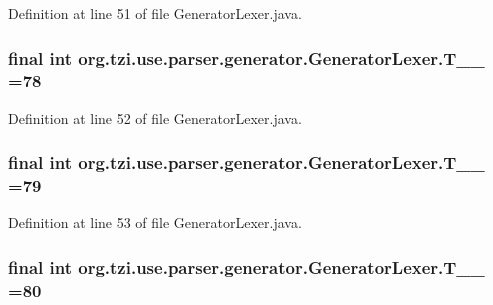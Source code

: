 Definition at line 51 of file Generator\-Lexer.\-java.

\hypertarget{classorg_1_1tzi_1_1use_1_1parser_1_1generator_1_1_generator_lexer_a52176cbdba59da5901c3ef3111036a15}{
\subsubsection[{T\-\_\-\-\_\-78}]{\setlength{\rightskip}{0pt plus 5cm}final int org.\-tzi.\-use.\-parser.\-generator.\-Generator\-Lexer.\-T\-\_\-\-\_ =78\hspace{0.3cm}{\ttfamily [static]}}}\label{classorg_1_1tzi_1_1use_1_1parser_1_1generator_1_1_generator_lexer_a52176cbdba59da5901c3ef3111036a15}


Definition at line 52 of file Generator\-Lexer.\-java.

\hypertarget{classorg_1_1tzi_1_1use_1_1parser_1_1generator_1_1_generator_lexer_a75c505ee100c9a2e37c7dbf0ff3bfdfe}{
\subsubsection[{T\-\_\-\-\_\-79}]{\setlength{\rightskip}{0pt plus 5cm}final int org.\-tzi.\-use.\-parser.\-generator.\-Generator\-Lexer.\-T\-\_\-\-\_ =79\hspace{0.3cm}{\ttfamily [static]}}}\label{classorg_1_1tzi_1_1use_1_1parser_1_1generator_1_1_generator_lexer_a75c505ee100c9a2e37c7dbf0ff3bfdfe}


Definition at line 53 of file Generator\-Lexer.\-java.

\hypertarget{classorg_1_1tzi_1_1use_1_1parser_1_1generator_1_1_generator_lexer_a556470606111d463b47520fba21083b5}{
\subsubsection[{T\-\_\-\-\_\-80}]{\setlength{\rightskip}{0pt plus 5cm}final int org.\-tzi.\-use.\-parser.\-generator.\-Generator\-Lexer.\-T\-\_\-\-\_ =80\hspace{0.3cm}{\ttfamily [static]}}}\label{classorg_1_1tzi_1_1use_1_1parser_1_1generator_1_1_generator_lexer_a556470606111d463b47520fba21083b5}


